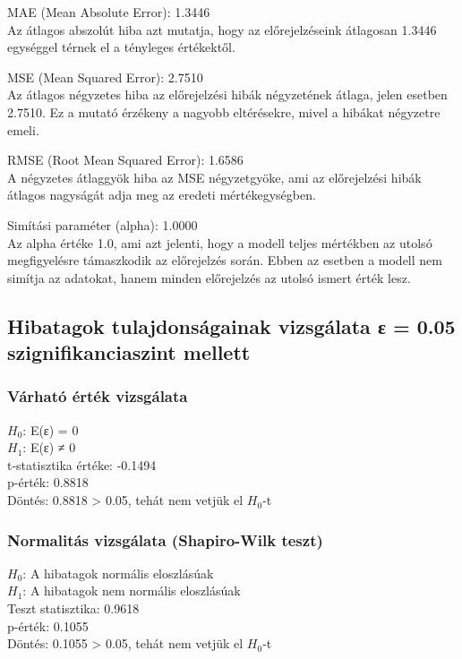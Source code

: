 \documentclass[11pt]{article}
\begin{document}
MAE (Mean Absolute Error): 1.3446\\
Az átlagos abszolút hiba azt mutatja, hogy az előrejelzéseink átlagosan
1.3446 egységgel térnek el a tényleges értékektől.

MSE (Mean Squared Error): 2.7510\\
Az átlagos négyzetes hiba az előrejelzési hibák négyzetének átlaga,
jelen esetben 2.7510. Ez a mutató érzékeny a nagyobb eltérésekre, mivel
a hibákat négyzetre emeli.

RMSE (Root Mean Squared Error): 1.6586\\
A négyzetes átlaggyök hiba az MSE négyzetgyöke, ami az előrejelzési
hibák átlagos nagyságát adja meg az eredeti mértékegységben.

Simítási paraméter (alpha): 1.0000\\
Az alpha értéke 1.0, ami azt jelenti, hogy a modell teljes mértékben az
utolsó megfigyelésre támaszkodik az előrejelzés során. Ebben az esetben
a modell nem simítja az adatokat, hanem minden előrejelzés az utolsó
ismert érték lesz.

\subsection{Hibatagok tulajdonságainak vizsgálata ε = 0.05
szignifikanciaszint
mellett}\label{hibatagok-tulajdonsuxe1gainak-vizsguxe1lata-ux3b5-0.05-szignifikanciaszint-mellett}

\subsubsection{Várható érték
vizsgálata}\label{vuxe1rhatuxf3-uxe9rtuxe9k-vizsguxe1lata}

$H_0$: E(ε) = 0\\
$H_1$: E(ε) ≠ 0\\
t-statisztika értéke: -0.1494\\
p-érték: 0.8818\\
Döntés: 0.8818 \textgreater{} 0.05, tehát nem vetjük el $H_0$-t

\subsubsection{Normalitás vizsgálata (Shapiro-Wilk
teszt)}\label{normalituxe1s-vizsguxe1lata-shapiro-wilk-teszt}

$H_0$: A hibatagok normális eloszlásúak\\
$H_1$: A hibatagok nem normális eloszlásúak\\
Teszt statisztika: 0.9618\\
p-érték: 0.1055\\
Döntés: 0.1055 \textgreater{} 0.05, tehát nem vetjük el $H_0$-t
\end{document}
